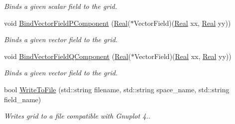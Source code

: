 \begin{DoxyCompactItemize}
\begin{DoxyCompactList}\small\item\em Binds a given scalar field to the grid. \end{DoxyCompactList}\item 
void \hyperlink{classmtk_1_1UniStgGrid2D_a479a14fa150b4048d4bdb9cfe11d34c1}{Bind\-Vector\-Field\-P\-Component} (\hyperlink{group__c01-roots_gac080bbbf5cbb5502c9f00405f894857d}{Real}($\ast$Vector\-Field)(\hyperlink{group__c01-roots_gac080bbbf5cbb5502c9f00405f894857d}{Real} xx, \hyperlink{group__c01-roots_gac080bbbf5cbb5502c9f00405f894857d}{Real} yy))
\begin{DoxyCompactList}\small\item\em Binds a given vector field to the grid. \end{DoxyCompactList}\item 
void \hyperlink{classmtk_1_1UniStgGrid2D_ab27b1875adb0ddba74561365fc8c3ef5}{Bind\-Vector\-Field\-Q\-Component} (\hyperlink{group__c01-roots_gac080bbbf5cbb5502c9f00405f894857d}{Real}($\ast$Vector\-Field)(\hyperlink{group__c01-roots_gac080bbbf5cbb5502c9f00405f894857d}{Real} xx, \hyperlink{group__c01-roots_gac080bbbf5cbb5502c9f00405f894857d}{Real} yy))
\begin{DoxyCompactList}\small\item\em Binds a given vector field to the grid. \end{DoxyCompactList}\item 
bool \hyperlink{classmtk_1_1UniStgGrid2D_a7c037d6b155a975ccfdee550144f4543}{Write\-To\-File} (std\-::string filename, std\-::string space\-\_\-name, std\-::string field\-\_\-name)
\begin{DoxyCompactList}\small\item\em Writes grid to a file compatible with Gnuplot 4.. \end{DoxyCompactList}\end{DoxyCompactItemize}
